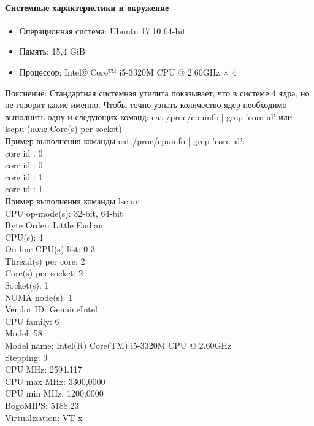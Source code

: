 \documentclass[utf8x, 12pt]{G7-32} %
\begin{document}
\paragraph{Системные характеристики и окружение}
\begin{itemize}
	\item Операционная система: Ubuntu 17.10 64-bit
	\item Память: 15,4 GiB
	\item Процессор: Intel® Core™ i5-3320M CPU @ 2.60GHz × 4
\end{itemize}

Пояснение: Стандартная системная утилита показывает, что в системе 4 ядра, но не говорит какие именно. Чтобы точно узнать количество ядер необходимо выполнить одну и следующих команд: cat /proc/cpuinfo | grep 'core id' или lscpu (поле Core(s) per socket)
\\

Пример выполнения команды cat /proc/cpuinfo | grep 'core id':\\
core id		: 0\\
core id		: 0\\
core id		: 1\\
core id		: 1\\

Пример выполнения команды lscpu:\\
CPU op-mode(s):      32-bit, 64-bit\\
Byte Order:          Little Endian\\
CPU(s):              4\\
On-line CPU(s) list: 0-3\\
Thread(s) per core:  2\\
Core(s) per socket:  2\\
Socket(s):           1\\
NUMA node(s):        1\\
Vendor ID:           GenuineIntel\\
CPU family:          6\\
Model:               58\\
Model name:          Intel(R) Core(TM) i5-3320M CPU @ 2.60GHz\\
Stepping:            9\\
CPU MHz:             2594.117\\
CPU max MHz:         3300,0000\\
CPU min MHz:         1200,0000\\
BogoMIPS:            5188.23\\
Virtualization:      VT-x\\
\end{document}
